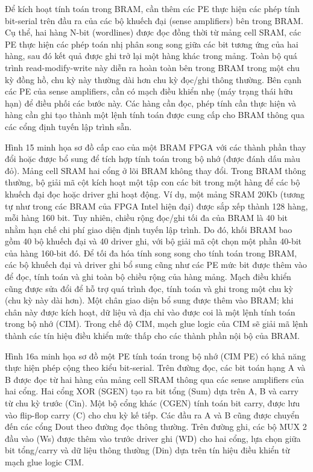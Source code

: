 \documentclass[a4paper]{article}
\begin{document}
Để kích hoạt tính toán trong BRAM, cần thêm các PE thực hiện các phép tính bit-serial trên đầu ra của các bộ khuếch đại (sense amplifiers) bên trong BRAM. Cụ thể, hai hàng N-bit (wordlines) được đọc đồng thời từ mảng cell SRAM, các PE thực hiện các phép toán nhị phân song song giữa các bit tương ứng của hai hàng, sau đó kết quả được ghi trở lại một hàng khác trong mảng. Toàn bộ quá trình read-modify-write này diễn ra hoàn toàn bên trong BRAM trong một chu kỳ đồng hồ, chu kỳ này thường dài hơn chu kỳ đọc/ghi thông thường. Bên cạnh các PE của sense amplifiers, cần có mạch điều khiển nhẹ (máy trạng thái hữu hạn) để điều phối các bước này. Các hàng cần đọc, phép tính cần thực hiện và hàng cần ghi tạo thành một lệnh tính toán được cung cấp cho BRAM thông qua các cổng định tuyến lập trình sẵn.

Hình 15 minh họa sơ đồ cấp cao của một BRAM FPGA với các thành phần thay đổi hoặc được bổ sung để tích hợp tính toán trong bộ nhớ (được đánh dấu màu đỏ). Mảng cell SRAM hai cổng ở lõi BRAM không thay đổi. Trong BRAM thông thường, bộ giải mã cột kích hoạt một tập con các bit trong một hàng để các bộ khuếch đại đọc hoặc driver ghi hoạt động. Ví dụ, một mảng SRAM 20Kb (tương tự như trong các BRAM của FPGA Intel hiện đại) được sắp xếp thành 128 hàng, mỗi hàng 160 bit. Tuy nhiên, chiều rộng đọc/ghi tối đa của BRAM là 40 bit nhằm hạn chế chi phí giao diện định tuyến lập trình. Do đó, khối BRAM bao gồm 40 bộ khuếch đại và 40 driver ghi, với bộ giải mã cột chọn một phần 40-bit của hàng 160-bit đó. Để tối đa hóa tính song song cho tính toán trong BRAM, các bộ khuếch đại và driver ghi bổ sung cũng như các PE mức bit được thêm vào để đọc, tính toán và ghi toàn bộ chiều rộng của hàng mảng. Mạch điều khiển cũng được sửa đổi để hỗ trợ quá trình đọc, tính toán và ghi trong một chu kỳ (chu kỳ này dài hơn). Một chân giao diện bổ sung được thêm vào BRAM; khi chân này được kích hoạt, dữ liệu và địa chỉ vào được coi là một lệnh tính toán trong bộ nhớ (CIM). Trong chế độ CIM, mạch glue logic của CIM sẽ giải mã lệnh thành các tín hiệu điều khiển mức thấp cho các thành phần nội bộ của BRAM.

Hình 16a minh họa sơ đồ một PE tính toán trong bộ nhớ (CIM PE) có khả năng thực hiện phép cộng theo kiểu bit-serial. Trên đường đọc, các bit toán hạng A và B được đọc từ hai hàng của mảng cell SRAM thông qua các sense amplifiers của hai cổng. Hai cổng XOR (SGEN) tạo ra bit tổng (Sum) dựa trên A, B và carry từ chu kỳ trước (Cin). Một bộ cổng khác (CGEN) tính toán bit carry, được lưu vào flip-flop carry (C) cho chu kỳ kế tiếp. Các đầu ra A và B cũng được chuyển đến các cổng Dout theo đường đọc thông thường. Trên đường ghi, các bộ MUX 2 đầu vào (Ws) được thêm vào trước driver ghi (WD) cho hai cổng, lựa chọn giữa bit tổng/carry và dữ liệu thông thường (Din) dựa trên tín hiệu điều khiển từ mạch glue logic CIM.
\end{document}
